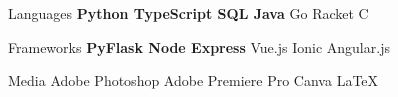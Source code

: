 

\begin{cvskills}

  \cvskill
  {Languages} %
  {\textbf{Python {\enskip\cdotp\enskip} TypeScript {\enskip\cdotp\enskip} SQL {\enskip\cdotp\enskip} Java } {\enskip\cdotp\enskip} Go {\enskip\cdotp\enskip} Racket {\enskip\cdotp\enskip} C } %

  \cvskill
  {Frameworks} %
  {\textbf{PyFlask {\enskip\cdotp\enskip} Node Express} {\enskip\cdotp\enskip} Vue.js {\enskip\cdotp\enskip} Ionic Angular.js}%



  \cvskill
  {Media} %
  {Adobe Photoshop {\enskip\cdotp\enskip} Adobe Premiere Pro {\enskip\cdotp\enskip} Canva {\enskip\cdotp\enskip} \LaTeX} %



\end{cvskills}
